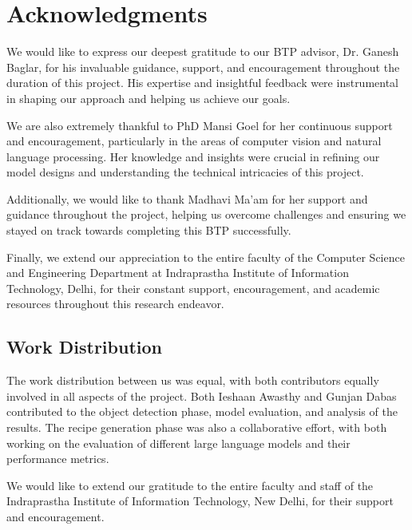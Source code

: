 \documentclass[letterpaper,11pt]{report}
\begin{document}
\section*{Acknowledgments}\label{section:acknowledgments}
\pagestyle{plain}
We would like to express our deepest gratitude to our BTP advisor, Dr. Ganesh Baglar, for his invaluable guidance, support, and encouragement throughout the duration of this project. His expertise and insightful feedback were instrumental in shaping our approach and helping us achieve our goals.

We are also extremely thankful to PhD Mansi Goel for her continuous support and encouragement, particularly in the areas of computer vision and natural language processing. Her knowledge and insights were crucial in refining our model designs and understanding the technical intricacies of this project.

Additionally, we would like to thank Madhavi Ma'am for her support and guidance throughout the project, helping us overcome challenges and ensuring we stayed on track towards completing this BTP successfully.

Finally, we extend our appreciation to the entire faculty of the Computer Science and Engineering Department at Indraprastha Institute of Information Technology, Delhi, for their constant support, encouragement, and academic resources throughout this research endeavor.

\vspace{2in}
\subsection*{Work Distribution}

The work distribution between us was equal, with both contributors equally involved in all aspects of the project. Both Ieshaan Awasthy and Gunjan Dabas contributed to the object detection phase, model evaluation, and analysis of the results. The recipe generation phase was also a collaborative effort, with both working on the evaluation of different large language models and their performance metrics.

\noindent We would like to extend our gratitude to the entire faculty and staff of the Indraprastha Institute of Information Technology, New Delhi, for their support and encouragement.
\newpage

\tableofcontents


\end{document}
